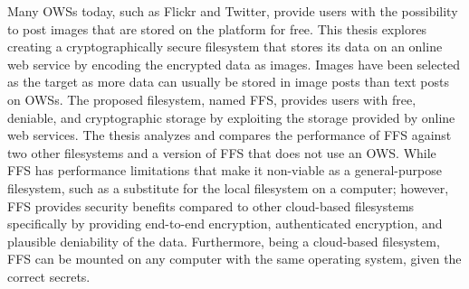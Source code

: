




Many \glspl{OWS} today, such as Flickr and Twitter, provide users with the possibility to post images that are stored on the platform for free. This thesis explores creating a cryptographically secure filesystem that stores its data on an online web service by encoding the encrypted data as images. Images have been selected as the target as more data can usually be stored in image posts than text posts on \glspl{OWS}. The proposed filesystem, named \gls{FFS}, provides users with free, deniable, and cryptographic storage by exploiting the storage provided by online web services. The thesis analyzes and compares the performance of \gls{FFS} against two other filesystems and a version of \gls{FFS} that does not use an \gls{OWS}. While \gls{FFS} has performance limitations that make it \mbox{non-viable} as a \mbox{general-purpose} filesystem, such as a substitute for the local filesystem on a computer; however, \gls{FFS} provides security benefits compared to other \mbox{cloud-based} filesystems specifically by providing \mbox{end-to-end} encryption, authenticated encryption, and plausible deniability of the data. Furthermore, being a \mbox{cloud-based} filesystem, \gls{FFS} can be mounted on any computer with the same operating system, given the correct secrets. 


